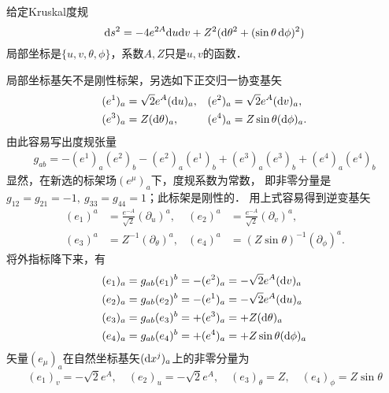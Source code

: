 \begin{example}\label{chrg:exm_Kruskal}
给定Kruskal度规
\begin{equation}
{\rm d}s^2= -4 e^{2A} {\rm d}u {\rm d}v + Z^{2}({\rm d}\theta^2 + (\sin\theta \, {\rm d}\phi)^2)
\end{equation}
局部坐标是$\{u,v,\theta,\phi \}$，系数$A,Z$只是$u,v$的函数．
\end{example}
\noindent {}
局部坐标基矢不是刚性标架，另选如下正交归一协变基矢
\begin{equation}
\begin{aligned}
  (e^1)_{a} & = \sqrt{2}e^A ({\rm d}u)_{a},
& (e^2)_{a} & = \sqrt{2}e^A ({\rm d}v)_{a},    \\
  (e^3)_{a} & = Z ({\rm d}\theta)_{a},
& (e^4)_{a} & = Z \sin\theta ({\rm d}\phi)_{a}.
\end{aligned}
\end{equation}
由此容易写出度规张量
\begin{align}
  g_{ab}  = - (e^1)_{a}(e^2)_{b} - (e^2)_{a}(e^1)_{b}
    + (e^3)_{a}(e^3)_{b}  + (e^4)_{a}(e^4)_{b}
\end{align}
显然，在新选的标架场$(e^\mu)_a$下，度规系数为常数，
即非零分量是$g_{12}=g_{21}=-1,\ g_{33}=g_{44}=1$；此标架是刚性的．
用上式容易得到逆变基矢
\begin{equation}
\begin{aligned}
(e_1)^{a} & = \frac{e^{-A}}{\sqrt{2}} (\partial_u)^{a},
   & (e_2)^{a} & = \frac{e^{-A}}{\sqrt{2}} (\partial_v)^{a},    \\
(e_3)^{a} & = Z^{-1} (\partial_\theta)^{a},
& (e_4)^{a} & = (Z \sin\theta)^{-1} (\partial_\phi)^{a}.
\end{aligned}
\end{equation}
将外指标降下来，有
\begin{equation}
\begin{aligned}
  (e_1)_{a}&=g_{ab} (e_1)^{b}= -(e^2)_{a} =-\sqrt{2}e^A ({\rm d}v)_{a} \\
  (e_2)_{a}&=g_{ab} (e_2)^{b}= -(e^1)_{a} =-\sqrt{2}e^A ({\rm d}u)_{a} \\
  (e_3)_{a}&=g_{ab} (e_3)^{b}= +(e^3)_{a} =+Z ({\rm d}\theta)_{a} \\
  (e_4)_{a}&=g_{ab} (e_4)^{b}= +(e^4)_{a} =+Z \sin\theta ({\rm d}\phi)_{a}
\end{aligned}
\end{equation}
\noindent {}
矢量$(e_\mu)_{a}$在自然坐标基矢$({\rm d}x^j)_{a}$上的非零分量为
\begin{equation}
  (e_1)_{v}=-\sqrt{2}e^A, \quad
  (e_2)_{u}=-\sqrt{2}e^A, \quad
  (e_3)_{\theta}=Z, \quad
  (e_4)_{\phi}=Z \sin\theta
\end{equation}

